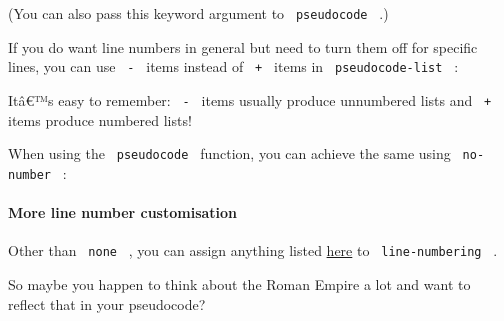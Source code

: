 \pandocbounded{}

(You can also pass this keyword argument to \texttt{\ pseudocode\ } .)

If you do want line numbers in general but need to turn them off for
specific lines, you can use \texttt{\ -\ } items instead of
\texttt{\ +\ } items in \texttt{\ pseudocode-list\ } :

\begin{Shaded}
\begin{Highlighting}[]
\NormalTok{\#pseudocode{-}list[}
\NormalTok{]}
\end{Highlighting}
\end{Shaded}

\pandocbounded{}

Itâ€™s easy to remember: \texttt{\ -\ } items usually produce unnumbered
lists and \texttt{\ +\ } items produce numbered lists!

When using the \texttt{\ pseudocode\ } function, you can achieve the
same using \texttt{\ no-number\ } :

\begin{Shaded}
\begin{Highlighting}[]
\NormalTok{)}
\end{Highlighting}
\end{Shaded}

\paragraph{More line number
customisation}\label{more-line-number-customisation}

Other than \texttt{\ none\ } , you can assign anything listed
\href{https://typst.app/docs/reference/model/numbering/\#parameters-numbering}{here}
to \texttt{\ line-numbering\ } .

So maybe you happen to think about the Roman Empire a lot and want to
reflect that in your pseudocode?

\begin{Shaded}
\begin{Highlighting}[]

\NormalTok{\#pseudocode{-}list(line{-}numbering: "I:")[}
\NormalTok{]}
\end{Highlighting}
\end{Shaded}

